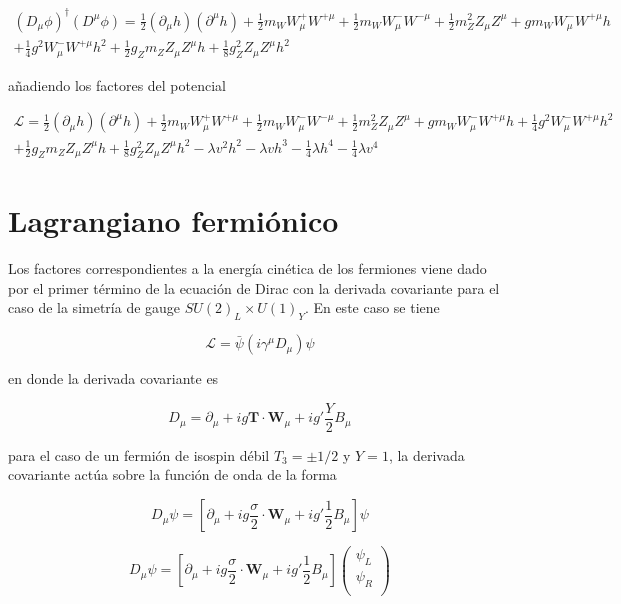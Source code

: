 \begin{multline}
    (D_{\mu}\phi)^{\dagger}(D^{\mu}\phi) = \frac{1}{2}(\partial_{\mu}h)(\partial^{\mu}h) +\frac{1}{2}m_WW_{\mu}^+ W^{+\mu} + \frac{1}{2}m_WW_{\mu}^- W^{-\mu} + \frac{1}{2}m_Z^2 Z_{\mu}Z^{\mu} +gm_WW_{\mu}^-W^{+\mu}h\\ 
    +\frac{1}{4}g^2W_{\mu}^-W^{+\mu}h^2 + \frac{1}{2}g_Zm_Z Z_{\mu}Z^{\mu}h + \frac{1}{8}g_Z^2Z_{\mu}Z^{\mu}h^2
\end{multline}

añadiendo los factores del potencial 

\begin{multline}
    \mathcal{L} = \frac{1}{2}(\partial_{\mu}h)(\partial^{\mu}h) +\frac{1}{2}m_WW_{\mu}^+ W^{+\mu} + \frac{1}{2}m_WW_{\mu}^- W^{-\mu} + \frac{1}{2}m_Z^2 Z_{\mu}Z^{\mu} +gm_WW_{\mu}^-W^{+\mu}h +\frac{1}{4}g^2W_{\mu}^-W^{+\mu}h^2\\
    + \frac{1}{2}g_Zm_Z Z_{\mu}Z^{\mu}h + \frac{1}{8}g_Z^2Z_{\mu}Z^{\mu}h^2 -\lambda v^2h^2-\lambda vh^3-\frac{1}{4}\lambda h^4 - \frac{1}{4}\lambda v^4
\end{multline}

\section{Lagrangiano fermiónico}

Los factores correspondientes a la energía cinética de los fermiones viene dado por el primer término de la ecuación de Dirac con la derivada covariante para el caso de la simetría de gauge $SU(2)_L\times U(1)_Y$. En este caso se tiene

$$ \mathcal{L} = \bar{\psi}(i\gamma^{\mu}D_{\mu})\psi $$

en donde la derivada covariante es 

$$ D_{\mu} = \partial_{\mu} + ig\textbf{T}\cdot \textbf{W}_{\mu} + ig'\frac{Y}{2}B_{\mu} $$

para el caso de un fermión de isospin débil $T_3 = \pm 1/2$ y $Y=1$, la derivada covariante actúa sobre la función de onda de la forma

$$ D_{\mu}\psi = \left[\partial_{\mu} + ig\frac{\sigma}{2}\cdot \textbf{W}_{\mu} + ig'\frac{1}{2}B_{\mu} \right]\psi $$

$$ D_{\mu}\psi = \left[\partial_{\mu} + ig\frac{\sigma}{2}\cdot \textbf{W}_{\mu} + ig'\frac{1}{2}B_{\mu} \right]\begin{pmatrix}
    \psi_L \\
    \psi_R\\\end{pmatrix}$$

